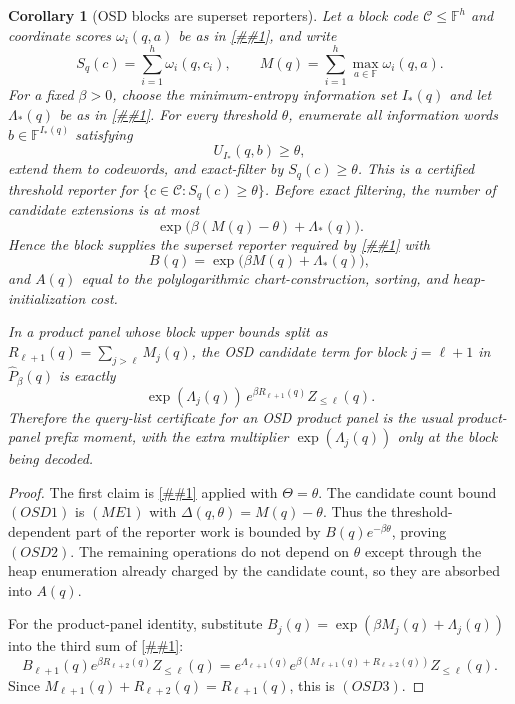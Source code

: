 \documentclass[10pt]{article}
\newcommand{\cref}[1]{\ref{##1}}
\newtheorem{corollary}[theorem]{Corollary}
\theoremstyle{definition}
\begin{document}
\begin{corollary}[OSD blocks are superset reporters]
   \label{cor:osd-superset-block-reporter}
   Let a block code \(\mathcal C\le\mathbb F^h\) and coordinate scores
   \(\omega_i(q,a)\) be as in \cref{lem:min-entropy-information-set}, and
   write
   \[
      S_q(c)=\sum_{i=1}^h\omega_i(q,c_i),
      \qquad
      M(q)=\sum_{i=1}^h\max_{a\in\mathbb F}\omega_i(q,a).
   \]
   For a fixed \(\beta>0\), choose the minimum-entropy information set
   \(I_*(q)\) and let \(\Lambda_*(q)\) be as in
   \cref{lem:min-entropy-information-set}.  For every threshold \(\theta\),
   enumerate all information words \(b\in\mathbb F^{I_*(q)}\) satisfying
   \[
      U_{I_*}(q,b)\ge\theta,
   \]
   extend them to codewords, and exact-filter by \(S_q(c)\ge\theta\).
   This is a certified threshold reporter for
   \(\{c\in\mathcal C:S_q(c)\ge\theta\}\).  Before exact filtering, the number
   of candidate extensions is at most
   \[
      \exp\bigl(\beta(M(q)-\theta)+\Lambda_*(q)\bigr).
      \tag{OSD1}
   \]
   Hence the block supplies the superset reporter required by
   \cref{lem:superset-product-panel-decoder} with
   \[
      B(q)=\exp\bigl(\beta M(q)+\Lambda_*(q)\bigr),
      \tag{OSD2}
   \]
   and \(A(q)\) equal to the polylogarithmic chart-construction, sorting, and
   heap-initialization cost.

   In a product panel whose block upper bounds split as
   \(R_{\ell+1}(q)=\sum_{j>\ell}M_j(q)\), the OSD candidate term for block
   \(j=\ell+1\) in \(\widehat P_\beta(q)\) is exactly
   \[
      \exp(\Lambda_j(q))\,e^{\beta R_{\ell+1}(q)}Z_{\le\ell}(q).
      \tag{OSD3}
   \]
   Therefore the query-list certificate for an OSD product panel is the usual
   product-panel prefix moment, with the extra multiplier
   \(\exp(\Lambda_j(q))\) only at the block being decoded.
\end{corollary}

\begin{proof}
   The first claim is \cref{lem:min-entropy-information-set} applied with
   \(\Theta=\theta\).  The candidate count bound \((OSD1)\) is \((ME1)\) with
   \(\Delta(q,\theta)=M(q)-\theta\).  Thus the threshold-dependent part of the
   reporter work is bounded by \(B(q)e^{-\beta\theta}\), proving \((OSD2)\).
   The remaining operations do not depend on \(\theta\) except through the heap
   enumeration already charged by the candidate count, so they are absorbed
   into \(A(q)\).

   For the product-panel identity, substitute
   \(B_j(q)=\exp(\beta M_j(q)+\Lambda_j(q))\) into the third sum of
   \cref{lem:superset-product-panel-decoder}:
   \[
      B_{\ell+1}(q)e^{\beta R_{\ell+2}(q)}Z_{\le\ell}(q)
      =
      e^{\Lambda_{\ell+1}(q)}
      e^{\beta(M_{\ell+1}(q)+R_{\ell+2}(q))}
      Z_{\le\ell}(q).
   \]
   Since \(M_{\ell+1}(q)+R_{\ell+2}(q)=R_{\ell+1}(q)\), this is \((OSD3)\).
\end{proof}
\end{document}
